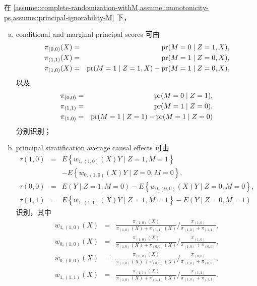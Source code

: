 \begin{theorem}
\label{thm::identification-PCEs-pscore-general-ding-lu}
在 \cref{assume::complete-randomization-withM,assume::monotonicity-ps,assume::principal-ignorability-M} 下，
\begin{enumerate}
[(a)]
\item
 conditional and marginal principal scores 可由
\begin{eqnarray*}
\pi_{(0,0)}(X) &=& \textup{pr}(M=0\mid Z=1, X),\\
\pi_{(1,1)}(X) &=& \textup{pr}(M=1\mid Z=0, X),\\
\pi_{(1,0)}(X) &=& \textup{pr}(M=1\mid Z=1, X) - \textup{pr}(M=1\mid Z=0, X).
\end{eqnarray*}
以及
\begin{eqnarray*}
\pi_{(0,0)} &=& \textup{pr}(M=0\mid Z=1),\\
\pi_{(1,1)} &=& \textup{pr}(M=1\mid Z=0),\\
\pi_{(1,0)} &=& \textup{pr}(M=1\mid Z=1) - \textup{pr}(M=1\mid Z=0)
\end{eqnarray*}
分别识别；
\item
principal stratification average causal effects 可由
\begin{eqnarray*}
\tau(1,0) &=& E\left\{w_{1, (1,0)}(X) Y \mid Z=1, M=1\right\}  \\
&& -E\left\{w_{0, (1,0)}(X) Y \mid Z=0, M=0\right\} , \\
\tau(0,0) &=& E(Y \mid Z=1, M=0)-E\left\{w_{0, (0,0)}( X ) Y \mid Z=0, M=0\right\}, \\
\tau(1,1) &=& E\left\{w_{1,  (1,1)}( X ) Y \mid Z=1, M=1\right\}-E(Y \mid Z=0, M=1)
\end{eqnarray*}
识别，其中
\begin{eqnarray*}
w_{1, (1,0)}(X) &=&\frac{\pi_{(1,0)}(X)}{\pi_{(1,0)}(X)+\pi_{(1,1)}(X)} \Big / \frac{\pi_{(1,0)}}{\pi_{(1,0)}+\pi_{(1,1)}} , \\
w_{0, (1,0)}(X) &=& \frac{\pi_{(1,0)}(X)}{\pi_{(1,0)}(X)+\pi_{(0,0)}(X)} \Big / \frac{\pi_{(1,0)}}{\pi_{(1,0)}+\pi_{(0,0)}} ,  \\
w_{0, (0,0)}(X) &=&\frac{\pi_{(0,0)}(X)}{\pi_{(1,0)}(X)+\pi_{(0,0)}(X)} \Big / \frac{\pi_{(0,0)}}{\pi_{(1,0)}+\pi_{(0,0)}} , \\
w_{1, (1,1)}(X) &=&\frac{\pi_{(1,1)}(X)}{\pi_{(1,0)}(X)+\pi_{(1,1)}(X)} \Big / \frac{\pi_{(1,1)}}{\pi_{(1,0)}+\pi_{(1,1)}} .
\end{eqnarray*}
\end{enumerate}
\end{theorem}




